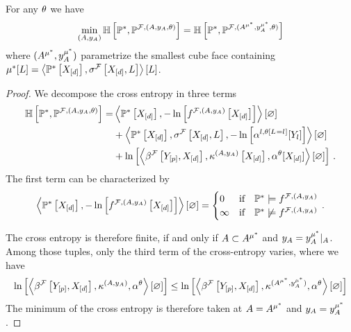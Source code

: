\begin{lemma}
    \label{lem:minCrossEntropyHardparam}
    For any $\theta$ we have
    \begin{align*}
        \min_{(A,y_{A})} \mathbb{H}\left[\mathbb{P}^*,\mathbb{P}^{\mathcal{F},(A,y_{A},\theta)}\right]
        = \mathbb{H}\left[\mathbb{P}^*,\mathbb{P}^{\mathcal{F},(A^{\mu^*},y_{A}^{\mu^*},\theta)}\right]
    \end{align*}
    where $(A^{\mu^*},y_{A}^{\mu^*})$ parametrize the smallest cube face containing $\mu^*[L]=\left\langle \mathbb{P}^*\left[X_{[d]}\right],\sigma^{\mathcal{F}}\left[X_{[d]},L\right]\right\rangle \left[ L \right]$.
\end{lemma}
\begin{proof}
    We decompose the cross entropy in three terms
    \begin{align*}
        \mathbb{H}\left[\mathbb{P}^*,\mathbb{P}^{\mathcal{F},(A,y_{A},\theta)}\right]
        =& \left\langle \mathbb{P}^*\left[X_{[d]}\right],-\ln \left[ f^{\mathcal{F},(A,y_{A})}\left[X_{[d]}\right] \right]\right\rangle \left[ \varnothing \right] \\
        &+ \left\langle \mathbb{P}^*\left[X_{[d]}\right],\sigma^{\mathcal{F}}\left[X_{[d]},L\right],-\ln \left[ \alpha^{l,\theta\left[L_{}=l_{}\right]}[Y_{l}] \right]\right\rangle \left[ \varnothing \right] \\
        &+ \ln \left[ \left\langle \beta^{\mathcal{F}}\left[Y_{[p]},X_{[d]}\right],\kappa^{(A,y_{A})}\left[X_{[d]}\right],\alpha^{\theta}[X_{[d]}]\right\rangle \left[ \varnothing \right] \right] \, .
    \end{align*}
    The first term can be characterized by
    \begin{align*}
        \left\langle \mathbb{P}^*\left[X_{[d]}\right],-\ln \left[ f^{\mathcal{F},(A,y_{A})}\left[X_{[d]}\right] \right]\right\rangle \left[ \varnothing \right]
        =\begin{cases}
             0 & \text{if}\quad \mathbb{P}^*\models f^{\mathcal{F},(A,y_{A})} \\
             \infty & \text{if}\quad \mathbb{P}^*\not\models f^{\mathcal{F},(A,y_{A})}
        \end{cases} \, .
    \end{align*}

    The cross entropy is therefore finite, if and only if $A\subset A^{\mu^*}$ and $y_{A}={y_{A}^{\mu^*}}|_{A}$.
    Among those tuples, only the third term of the cross-entropy varies, where we have
    \begin{align*}
        \ln \left[ \left\langle \beta^{\mathcal{F}}\left[Y_{[p]},X_{[d]}\right],\kappa^{(A,y_{A})},\alpha^{\theta}\right\rangle \left[ \varnothing \right] \right] \leq \ln \left[ \left\langle \beta^{\mathcal{F}}\left[Y_{[p]},X_{[d]}\right],\kappa^{(A^{\mu^*},y_{A}^{\mu^*})},\alpha^{\theta}\right\rangle \left[ \varnothing \right] \right]
    \end{align*}
    The minimum of the cross entropy is therefore taken at $A=A^{\mu^*}$ and $y_{A}=y_{A}^{\mu^*}$.
\end{proof}

